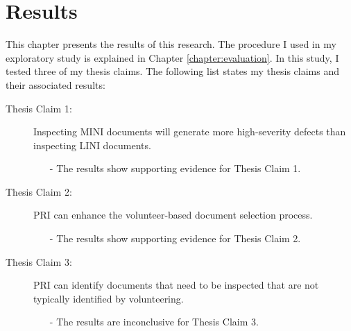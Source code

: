 

\chapter{Results}
\label{chapter:results}
This chapter presents the results of this research. The procedure I used in
my exploratory study is explained in Chapter \ref{chapter:evaluation}. In
this study, I tested three of my thesis claims. The following list states
my thesis claims and their associated results:

\begin{description}

\item[Thesis Claim 1:] Inspecting MINI documents will generate more
  high-severity defects than inspecting LINI documents.
\begin{itemize}
\item[-] The results show supporting evidence for Thesis Claim 1.
\end{itemize}

\item[Thesis Claim 2:] PRI can enhance the volunteer-based document
  selection process.
\begin{itemize}
\item[-] The results show supporting evidence for Thesis Claim 2.
\end{itemize}

\item[Thesis Claim 3:] PRI can identify documents that need to be inspected
  that are not typically identified by volunteering.
\begin{itemize}
\item[-] The results are inconclusive for Thesis Claim 3. 
\end{itemize}
\end{description}

